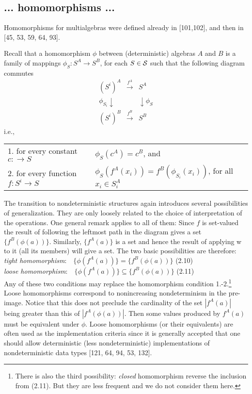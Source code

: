 \documentclass[10pt]{article}
\newcommand{\Car}[1]{|#1|}
\newcommand{\into}{\mathrel{\rightarrow}}
\newcommand{\Sorts}{{\cal S}}
\begin{document}
\subsection{... homomorphisms ...}
Homomorphisms for multialgebras 
were defined already in [101,102], and then in [45, 53, 59, 64, 93]. 

Recall that a homomorphism $\phi$ between (deterministic) algebras $A$ 
and $B$ is a family of mappings $\phi_{S}:S^{A}\into S^{B}$, for each 
$S\in\Sorts$ such that the following diagram commutes
\[ \begin{array}{rcl}
(S^{i})^{A} & \stackrel{f^{A}}\longrightarrow & S^{A} \\
\phi_{S_{i}} \downarrow & & \downarrow \phi_{S} \\
(S^{i})^{B} & \stackrel{f^{B}}\longrightarrow & S^{B} 
\end{array}
\]
\noindent
i.e., \begin{tabular}[t]{l@{\ :\ }l}
1. for every constant $c:\into S$ & $\phi_{S}(c^{A}) = c^{B}$,  and \\
2. for every function $f:S^{i}\into S$ & $\phi_{S}(f^{A}(x_{i})) = 
f^{B}(\phi_{S_{i}}(x_{i}))$, for all $x_{i}\in S_{i}^{A}$
\end{tabular}

\noindent
The transition to nondeterministic structures 
again introduces several possibilities of generalization. They are 
only loosely related to the choice of interpretation of the 
operations. One general remark applies to all of them: Since $f$
is set-valued the result of following the leftmost path in the 
diagram gives a set $\{f^{B}(\phi(a))\}$. Similarly, 
$\{f^{A}(a)\}$ 
 is a set and hence the result of applying w to it (all its members) 
will give a set. The two basic possibilities are therefore:  \\
\hspace*{2em} {\em tight homomorphism}:\ \ $\{\phi(f^{A}(a))\} = 
\{f^{B}(\phi(a))\}$ \hfill(2.10) \\
\hspace*{2em} {\em loose homomorphism}:\ \ $\{\phi(f^{A}(a))\} 
\subseteq \{f^{B}(\phi(a))\}$ \hfill(2.11) \\
%
Any of these two conditions may 
replace the homomorphism condition 1.-2.\footnote{There is also the 
third possibility: {\em closed} homomorphism reverse the inclusion 
from (2.11). But they are less frequent and we do not consider them 
here.} Loose homomorphisms 
correspond to nonincreasing nondeterminism in the pre-image. Notice 
that this does not preclude the cardinality of the set 
$\Car{f^{A}(a)}$
being greater than this of $\Car{f^{A}(\phi(a))}$. 
Then some values produced by $f^{A}(a)$
 must be equivalent under $\phi$. Loose homomorphisms (or their 
equivalents) are often used as the implementation criteria since it 
is generally accepted that one should allow deterministic (less 
nondeterministic) implementations of nondeterministic data types
 [121, 64, 94, 53, 132].
\end{document}
